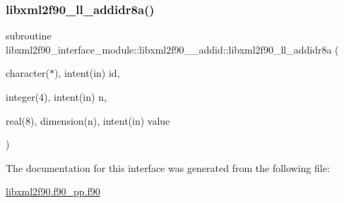 \mbox{\label{interfacelibxml2f90__interface__module_1_1libxml2f90____addid_abb6ee1f76f80fab72d6b6e6c9ed66a66}} 
\subsubsection{\texorpdfstring{libxml2f90\+\_\+ll\+\_\+addidr8a()}{libxml2f90\_ll\_addidr8a()}}
{\footnotesize\ttfamily subroutine libxml2f90\+\_\+interface\+\_\+module\+::libxml2f90\+\_\+\+\_\+addid\+::libxml2f90\+\_\+ll\+\_\+addidr8a (\begin{DoxyParamCaption}\item[{character($\ast$), intent(in)}]{id,  }\item[{integer(4), intent(in)}]{n,  }\item[{real(8), dimension(n), intent(in)}]{value }\end{DoxyParamCaption})}



The documentation for this interface was generated from the following file\+:\begin{DoxyCompactItemize}
\item 
\hyperlink{libxml2f90_8f90__pp_8f90}{libxml2f90.\+f90\+\_\+pp.\+f90}\end{DoxyCompactItemize}
